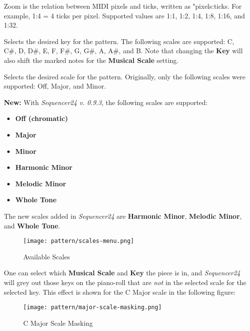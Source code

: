    Zoom is the relation between MIDI pixels and ticks, written as
   "pixels:ticks.
   For example, 1:4 = 4 ticks per pixel.
   Supported values are 1:1, 1:2, 1:4, 1:8, 1:16, and 1:32.

   Selects the desired key for the pattern.  The following scales are
   supported:  C, C\#, D, D\#, E, F, F\#, G, G\#, A, A\#, and B.
   Note that changing the \textbf{Key} will also shift the marked notes
   for the \textbf{Musical Scale} setting.

   Selects the desired scale for the pattern.
   Originally, only the following scales were supported: Off, Major, and Minor.

   \textbf{New:}
   With \textsl{Sequencer24 v. 0.9.3}, the following scales are supported:

   \begin{itemize}
      \item \textbf{Off (chromatic)}
      \item \textbf{Major}
      \item \textbf{Minor}
      \item \textbf{Harmonic Minor}
      \item \textbf{Melodic Minor}
      \item \textbf{Whole Tone}
   \end{itemize}

   The new scales added in \textsl{Sequencer24} are
   \textbf{Harmonic Minor}, \textbf{Melodic Minor}, and \textbf{Whole Tone}.

\begin{figure}[H]
   \centering 
   \texttt{[image: pattern/scales-menu.png]}
   \caption{Available Scales}
   \label{fig:pattern_editor_available_scales}
\end{figure}

   One can select which \textbf{Musical Scale} and
   \textbf{Key} the piece is in,
   and \textsl{Sequencer24} will grey out those keys on the piano-roll that
   are \textsl{not} in the selected scale for the selected key.
   This effect is shown for the C Major scale in the following figure:

\begin{figure}[H]
   \centering 
   \texttt{[image: pattern/major-scale-masking.png]}
   \caption{C Major Scale Masking}
   \label{fig:pattern_editor_major_scale_masking}
\end{figure}

